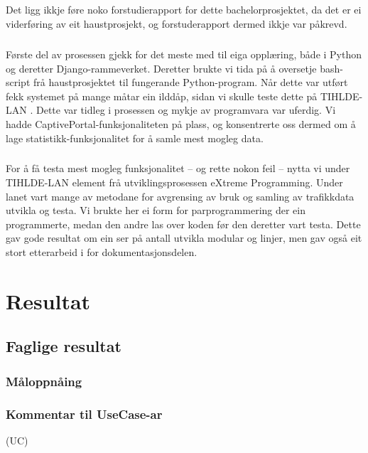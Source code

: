 \documentclass[nynorsk,12pt,a4paper,oneside]{book}
\begin{document}
\paragraph{}
Det ligg ikkje føre noko forstudierapport for dette bachelorprosjektet, da det er ei viderføring av eit haustprosjekt, og forstuderapport dermed ikkje var påkrevd. 
\paragraph{}
Første del av prosessen gjekk for det meste med til eiga opplæring, både i Python og deretter Django-rammeverket. Deretter brukte vi tida på å oversetje bash-script frå haustprosjektet til fungerande Python-program. Når dette var utført fekk systemet på mange måtar ein ilddåp, sidan vi skulle teste dette på TIHLDE-LAN . Dette var tidleg i prosessen og mykje av programvara var uferdig. Vi hadde CaptivePortal-funksjonaliteten på plass, og konsentrerte oss dermed om å lage statistikk-funksjonalitet for å samle mest mogleg data.
\paragraph{}
For å få testa mest mogleg funksjonalitet -- og rette nokon feil -- nytta vi under TIHLDE-LAN element frå utviklingsprosessen eXtreme Programming. Under lanet vart mange av metodane for avgrensing av bruk og samling av trafikkdata utvikla og testa. Vi brukte her ei form for parprogrammering der ein programmerte, medan den andre las over koden før den deretter vart testa. Dette gav gode resultat om ein ser på antall utvikla modular og linjer, men gav også eit stort etterarbeid i for dokumentasjonsdelen.
\paragraph{}


\chapter{Resultat}

\section{Faglige resultat}
\subsection{Måloppnåing}
	
\subsection{Kommentar til UseCase-ar}
(UC)
\end{document}
